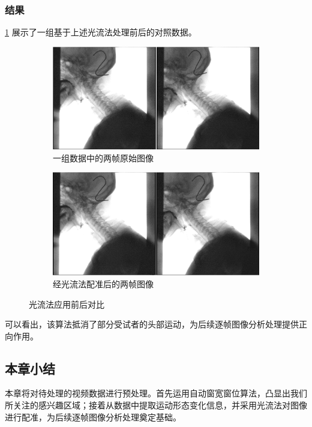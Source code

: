 \subsubsection{结果}

\cref{fig:2_2_对比} 展示了一组基于上述光流法处理前后的对照数据。
\clearpage
\begin{figure}[!htp]
    \centering
    \begin{subfigure}{\textwidth}
        \centering
        \includegraphics[width=\textwidth]{figures/2_3_1.png}
        \caption{一组数据中的两帧原始图像}
    \end{subfigure}
    
    \begin{subfigure}{\textwidth}
        \centering
        \includegraphics[width=\textwidth]{figures/2_3_2.png}
        \caption{经光流法配准后的两帧图像}
    \end{subfigure}
    \caption{光流法应用前后对比}
    \label{fig:2_2_对比}
\end{figure}

可以看出，该算法抵消了部分受试者的头部运动，为后续逐帧图像分析处理提供正向作用。

\subsection{本章小结}

本章将对待处理的视频数据进行预处理。首先运用自动窗宽窗位算法，凸显出我们所关注的感兴趣区域；接着从数据中提取运动形态变化信息，并采用光流法对图像进行配准，为后续逐帧图像分析处理奠定基础。